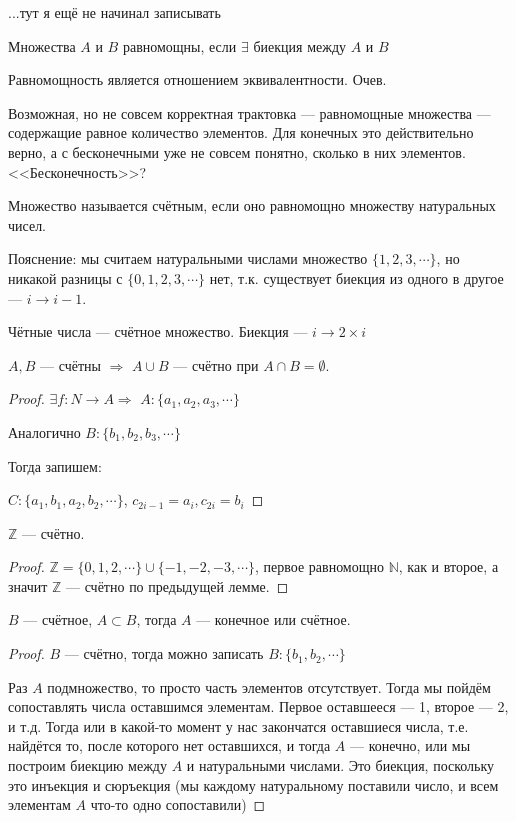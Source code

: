 ...тут я ещё не начинал записывать
\begin{definition}
    Множества $A$ и $B$ равномощны, если $\exists$ биекция между $A$ и $B$ 
\end{definition}
\begin{remark}
	Равномощность является отношением эквивалентности. Очев.
\end{remark}
Возможная, но не совсем корректная трактовка --- равномощные множества --- содержащие равное количество элементов. Для конечных это действительно верно, а с бесконечными уже не совсем понятно, сколько в них элементов. <<Бесконечность>>?

\begin{definition}
	Множество называется счётным, если оно равномощно множеству натуральных чисел.
\end{definition}

Пояснение: мы считаем натуральными числами множество $\{1, 2, 3, \cdots\}$, но никакой разницы с $\{0, 1, 2, 3, \cdots\}$ нет, т.к. существует биекция из одного в другое --- $i \to i - 1$.

\begin{example}
	Чётные числа --- счётное множество. Биекция --- $i \to 2 \times i$
\end{example}

\begin{lemma}
$A, B$ --- счётны $\Rightarrow$ $A \cup B$ --- счётно при $A \cap B = \emptyset$.
\end{lemma}
\begin{proof}
	$\exists f: N \to A \Rightarrow$ $A : \{a_1, a_2, a_3, \cdots\}$

	Аналогично $B: \{b_1, b_2, b_3, \cdots\}$

	Тогда запишем:

	$C: \{a_1, b_1, a_2, b_2, \cdots\}$, $c_{2i - 1} = a_i, c_{2i} = b_i$
\end{proof}
\begin{consequence}
$\mathbb{Z}$ --- счётно.
\end{consequence}
\begin{proof}
	$\mathbb{Z} = \{0, 1, 2, \cdots\} \cup \{-1, -2, -3, \cdots\}$, первое равномощно $\mathbb{N}$, как и второе, а значит $\mathbb{Z}$ --- счётно по предыдущей лемме.
\end{proof}
\begin{lemma}
	$B$ --- счётное, $A \subset B$, тогда $A$ --- конечное или счётное.
\end{lemma}
\begin{proof}
	$B$ ---  счётно, тогда можно записать $B: \{b_1, b_2, \cdots\}$

	Раз $A$ подмножество, то просто часть элементов отсутствует. Тогда мы пойдём сопоставлять числа оставшимся элементам. Первое оставшееся --- 1, второе --- 2, и т.д. Тогда или в какой-то момент у нас закончатся оставшиеся числа, т.е. найдётся то, после которого нет оставшихся, и тогда $A$ --- конечно, или мы построим биекцию между $A$ и натуральными числами. Это биекция, поскольку это инъекция и сюръекция (мы каждому натуральному поставили число, и всем элементам $A$ что-то одно сопоставили)
\end{proof}

